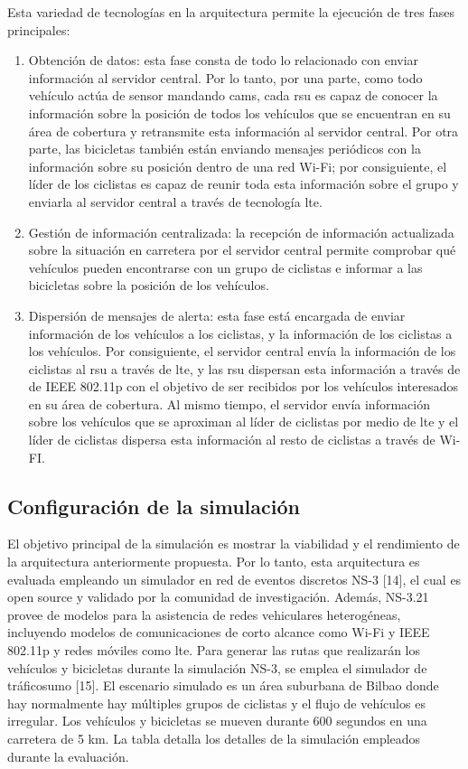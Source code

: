 Esta variedad de tecnologías en la arquitectura permite la ejecución de tres fases principales:
\begin{enumerate}
	\item Obtención de datos: esta fase consta de todo lo relacionado con enviar información al servidor central. Por lo tanto, por una parte, como todo vehículo actúa de sensor mandando \gls{cam}s, cada \gls{rsu} es capaz de conocer la información sobre la posición de todos los vehículos que se encuentran en su área de cobertura y retransmite esta información al servidor central. Por otra parte, las bicicletas también están enviando mensajes periódicos con la información sobre su posición dentro de una red Wi-Fi; por consiguiente, el líder de los ciclistas es capaz de reunir toda esta información sobre el grupo y enviarla al servidor central a través de tecnología \gls{lte}.
	
	\item Gestión de información centralizada: la recepción de información actualizada sobre la situación en carretera por el servidor central permite comprobar qué vehículos pueden encontrarse con un grupo de ciclistas e informar a las bicicletas sobre la posición de los vehículos.
	
	\item Dispersión de mensajes de alerta: esta fase está encargada de enviar información de los vehículos a los ciclistas, y la información de los ciclistas a los vehículos. Por consiguiente, el servidor central envía la información de los ciclistas al \gls{rsu} a través de \gls{lte}, y las \gls{rsu} dispersan esta información a través de de IEEE 802.11p con el objetivo de ser recibidos por los vehículos interesados en su área de cobertura. Al mismo tiempo, el servidor envía información sobre los vehículos que se aproximan al líder de ciclistas por medio de \gls{lte} y el líder de ciclistas dispersa esta información al resto de ciclistas a través de Wi-FI.
\end{enumerate}
\subsection{Configuración de la simulación}
El objetivo principal de la simulación es mostrar la viabilidad y el rendimiento de la arquitectura anteriormente propuesta. Por lo tanto, esta arquitectura es evaluada empleando un simulador en red de eventos discretos NS-3 [14], el cual es open source y validado por la comunidad de investigación. Además, NS-3.21 provee de modelos para la asistencia de redes vehiculares heterogéneas, incluyendo modelos de comunicaciones de corto alcance como Wi-Fi y IEEE 802.11p y redes móviles como \gls{lte}. Para generar las rutas que realizarán los vehículos y bicicletas durante la simulación NS-3, se emplea el simulador de tráfico\gls{sumo} [15]. El escenario simulado es un área suburbana de Bilbao donde hay normalmente hay múltiples grupos de ciclistas y el flujo de vehículos es irregular. Los vehículos y bicicletas se mueven durante 600 segundos en una carretera de 5 km. La tabla     detalla los detalles de la simulación empleados durante la evaluación.

